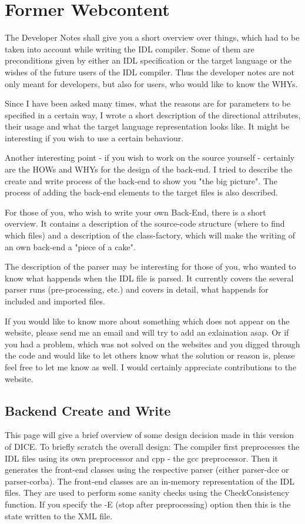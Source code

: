 \section{Former Webcontent} 

The Developer Notes shall give you a short overview over things, which
had to be taken into account while writing the IDL compiler. Some of
them are preconditions given by either an IDL specification or the
target language or the wishes of the future users of the IDL
compiler. Thus the developer notes are not only meant for developers,
but also for users, who would like to know the WHYs.

Since I have been asked many times, what the reasons are for
parameters to be specified in a certain way, I wrote a short
description of the directional attributes, their usage and what the
target language representation looks like. It might be interesting if
you wish to use a certain behaviour.

Another interesting point - if you wish to work on the source yourself
- certainly are the HOWs and WHYs for the design of the back-end. I
tried to describe the create and write process of the back-end to show
you "the big picture". The process of adding the back-end elements to
the target files is also described.

For those of you, who wish to write your own Back-End, there is a
short overview. It contains a description of the source-code structure
(where to find which files) and a description of the class-factory,
which will make the writing of an own back-end a "piece of a cake".

The description of the parser may be interesting for those of you, who
wanted to know what happends when the IDL file is parsed. It currently
covers the several parser runs (pre-processing, etc.) and covers in
detail, what happends for included and imported files.

If you would like to know more about something which does not appear
on the website, please send me an email and will try to add an
exlaination asap. Or if you had a problem, which was not solved on the
websites and you digged through the code and would like to let others
know what the solution or reason is, please feel free to let me know
as well. I would certainly appreciate contributions to the website.

\subsection{Backend Create and Write}
This page will give a brief overview of some design decision made in
this version of DICE. To briefly scratch the overall design: The
compiler first preprocesses the IDL files using its own preprocessor
and cpp - the gcc preprocessor. Then it generates the front-end
classes using the respective parser (either parser-dce or
parser-corba). The front-end classes are an in-memory representation
of the IDL files. They are used to perform some sanity checks using
the CheckConsistency function. If you specify the -E (stop after
preprocessing) option then this is the state written to the XML file.

